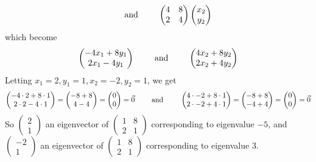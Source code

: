 \documentclass[12pt]{article}
\newenvironment{problem}[2][Problem]
{
	\begin{trivlist} 
		\item[\hskip \labelsep {\bfseries #1 #2:}]
	}
{
	\end{trivlist}
	}
\newenvironment{solution}[1][Solution]
{
	\begin{trivlist} 
		\item[\hskip \labelsep {\itshape #1:}]
	}
	{
	\end{trivlist}
}
\begin{document}
\begin{problem}{2}
\begin{solution}
\[ \hphantom{1000}
 \text{ and }
 \hphantom{1000}
\begin{pmatrix}4&8\\2&4\end{pmatrix}\begin{pmatrix} x_{2}\\y_{2}\end{pmatrix} %
\]
which become
\[
\begin{pmatrix}-4x_{1}+8y_{1}\\2x_{1}-4y_{1}\end{pmatrix} %
 \hphantom{1000}
 \text{ and }
 \hphantom{1000}
\begin{pmatrix}4x_{2}+8y_{2}\\2x_{2}+4y_{2}\end{pmatrix}%
\]
Letting $x_{1}=2,y_{1}=1,x_{2}=-2,y_{2}=1$, we get
\[
\begin{pmatrix}-4\cdot 2+8\cdot 1\\2\cdot 2-4\cdot 1\end{pmatrix} =\begin{pmatrix}-8+8\\4-4\end{pmatrix} = \begin{pmatrix}0\\0\end{pmatrix}= \vec{0} %
 \hphantom{1000}
 \text{ and }
 \hphantom{1000}
\begin{pmatrix}4\cdot -2+8\cdot 1\\2\cdot -2+4\cdot 1\end{pmatrix} =\begin{pmatrix}-8+8\\-4+4\end{pmatrix}  = \begin{pmatrix}0\\0\end{pmatrix}=\vec{0} %
\]
So $\begin{pmatrix}2\\1\end{pmatrix}$ an eigenvector of $\begin{pmatrix}1&8\\2&1\end{pmatrix}$ corresponding to eigenvalue $-5$, and $\begin{pmatrix}-2\\1\end{pmatrix}$ an eigenvector of $\begin{pmatrix}1&8\\2&1\end{pmatrix}$ corresponding to eigenvalue $3$.

\end{solution}
\end{problem}
\end{document}
